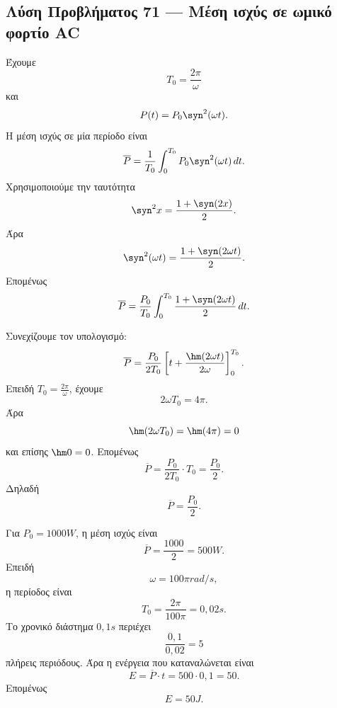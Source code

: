 \subsection*{Λύση Προβλήματος 71 --- Μέση ισχύς σε ωμικό φορτίο AC}

\begin{alist}
  \item Έχουμε
        \[
          T_0=\frac{2\pi}{\omega}
        \]
        και
        \[
          P(t)=P_0\syn^2(\omega t).
        \]
        Η μέση ισχύς σε μία περίοδο είναι
        \[
          \overline{P}
          =
          \frac{1}{T_0}\int_0^{T_0}P_0\syn^2(\omega t)\,dt.
        \]
        Χρησιμοποιούμε την ταυτότητα
        \[
          \syn^2 x=\frac{1+\syn(2x)}{2}.
        \]
        Άρα
        \[
          \syn^2(\omega t)
          =
          \frac{1+\syn(2\omega t)}{2}.
        \]
        Επομένως
        \[
          \overline{P}
          =
          \frac{P_0}{T_0}
          \int_0^{T_0}
          \frac{1+\syn(2\omega t)}{2}\,dt.
        \]

  \item Συνεχίζουμε τον υπολογισμό:
        \[
          \overline{P}
          =
          \frac{P_0}{2T_0}
          \left[
            t+\frac{\hm(2\omega t)}{2\omega}
          \right]_0^{T_0}.
        \]
        Επειδή \(T_0=\frac{2\pi}{\omega}\), έχουμε
        \[
          2\omega T_0=4\pi.
        \]
        Άρα
        \[
          \hm(2\omega T_0)=\hm(4\pi)=0
        \]
        και επίσης \(\hm0=0\). Επομένως
        \[
          \overline{P}
          =
          \frac{P_0}{2T_0}\cdot T_0
          =
          \frac{P_0}{2}.
        \]
        Δηλαδή
        \[
          {\overline{P}=\frac{P_0}{2}}.
        \]

  \item Για \(P_0=1000\si{W}\), η μέση ισχύς είναι
        \[
          \overline{P}=\frac{1000}{2}=500\si{W}.
        \]
        Επειδή
        \[
          \omega=100\pi\si{rad/s},
        \]
        η περίοδος είναι
        \[
          T_0=\frac{2\pi}{100\pi}=0{,}02\si{s}.
        \]
        Το χρονικό διάστημα \(0{,}1\si{s}\) περιέχει
        \[
          \frac{0{,}1}{0{,}02}=5
        \]
        πλήρεις περιόδους. Άρα η ενέργεια που καταναλώνεται είναι
        \[
          E=\overline{P}\cdot t
          =
          500\cdot0{,}1
          =
          50.
        \]
        Επομένως
        \[
          {E=50\si{J}}.
        \]
\end{alist}

